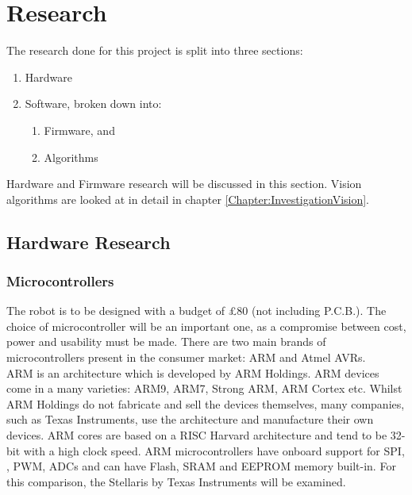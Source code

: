 \chapter{Research} \label{Chapter:Research}
The research done for this project is split into three sections:
\begin{enumerate}
\item Hardware
\item Software, broken down into:
\begin{enumerate}
\item Firmware, and
\item Algorithms
\end{enumerate}
\end{enumerate}

Hardware and Firmware research will be discussed in this section. Vision algorithms are looked at in detail in chapter \ref{Chapter:InvestigationVision}.
\section{Hardware Research}
\subsection{Microcontrollers}
The robot is to be designed with a budget of \pounds 80 (not including P.C.B.). The choice of microcontroller will be an important one, as a compromise between cost, power and usability must be made. There are two main brands of microcontrollers present in the consumer market: ARM and Atmel AVRs.\\ %
ARM is an architecture which is developed by ARM Holdings. ARM devices come in a many varieties: ARM9, ARM7, Strong ARM, ARM Cortex etc. Whilst ARM Holdings do not fabricate and sell the devices themselves, many companies, such as Texas Instruments, use the architecture and manufacture their own devices. ARM cores are based on a RISC Harvard architecture and tend to be 32-bit with a high clock speed. ARM microcontrollers have onboard support for SPI, \itc, PWM, ADCs and can have Flash, SRAM and EEPROM memory built-in. For this comparison, the Stellaris by Texas Instruments will be examined. 

